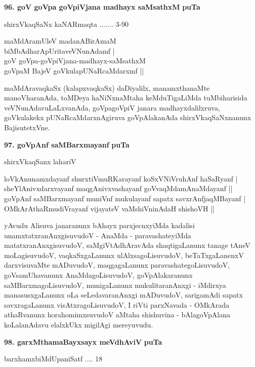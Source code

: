 \medskip
\noindent
\textbf{96. goV goVpa goVpiVjana madhayx saMsathxM} \hfill{\bf puTa \pageref{229}}

\hfill{shirxVkaqSaNx kaNARmaqta ....... 3-90}

\begin{shloka}
maMdAramUleV madanABirAmaM\\
biMbAdharApUritaveVNunAdamf |\\
goV goVpa-goVpiVjana-madhayx-saMsathxM \\
goVpaM BajeV goVkulapUNaRcaMdarxmf ||
\end{shloka}

maMdAravaqkaSx (kalapxvaqkaSx) daDiyalilx, manamxthanaMte manoVharanAda, toMDeya haNiNxnaMtaha keMduTi\-gaLiMda tuMbiharisida veVNunAdavuLaLxvanAda, goVpa\break goVpiV janara madhayxdalilxruva, goVkulakekx pUNaR\-caMdarxnAgiruva goVpAlakanAda shirxVkaqSaNxnanunx BajisutetxVne.


\smallskip
\noindent
\textbf{97. goVpAnf saMBarxmayanf} \hfill{\bf puTa \pageref{229}}

\hfill{shirxVkaqSanx lahariV}

\begin{shloka}
loVkAnunamxdayanf shurxtiVmuRKarayanf koSxVNiVruhAnf haSaRyanf |\\
sheYlAnivxdarxvayanf maqgAnivxvashayanf goVvaqMdamAnaMdayanf ||\\
goVpAnf saMBarxmayanf muniVnf mukulayanf sapatx savxrAnfjaqMBayanf |\\
OMkArAthaRmudiVrayanf vijayateV vaMshiVninAdaH shishoVH ||
\end{shloka}

\smallskip
yAvudu Alisuva janaranunx bAhayx parxjecnxyiMda kadalisi unamxtatxranAnxgi\break\-su\-vudoV  - AnaMda - para\-vashateyiMda matatxranAnxgisuvudoV, saMgiVtAdhAra\-vAda shaqtigaLanunx tanage tAneV moLagisuvudoV, vaqkaSx\-gaLanunx ulAlxsagoLisu\break\-vudoV, beTaTxgaLanenxV darxvisuvaMte mADuvudoV, maqgagaLanunx paravashate\-goLisu\-vudoV, goVsamUhavanunx AnaMdagoLisuvudoV, goVpAlakaranunx saMBarxma\-goLisuvudoV, muni\-gaLanunx mukulitaranAnxgi - iMdirxya manasusxgaLanunx oLa seLedavaranAnxgi mADuvudoV, sarigamAdi sapatx savxragaLanunx visAtxragoLisuvudoV, I riVti parxNavada - OMkArada athaRvanunx horahomimxsu\-vudoV aMtaha shishuvina - bAlagoVpAlana koLalanAdavu elalxkUkx migilAgi mereyuvudu.

\medskip
\noindent
\textbf{98. garxMthamaBayxsayx meVdhAviV} \hfill{\bf puTa \pageref{42c}}

\hfill{barxhamxbiMdUpaniSatf .... 18}

